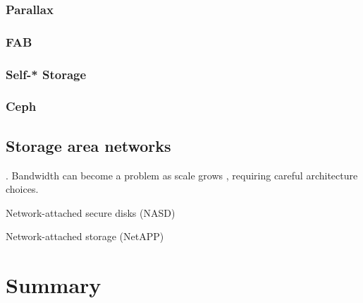 \subsubsection{Parallax}
\cite{warfield}
\subsubsection{FAB}
\cite{frolund,saito04,ji}
\subsubsection{Self-* Storage}
\cite{ganger}
\subsubsection{Ceph}
\cite{weil}

\subsection{Storage area networks}
\cite{burns}. Bandwidth can become a problem as scale grows \cite{hospodor}, requiring careful architecture choices.

Network-attached secure disks (NASD) \cite{gibson97,gibson98a}

Network-attached storage (NetAPP) \cite{hitz}

\section{Summary}
